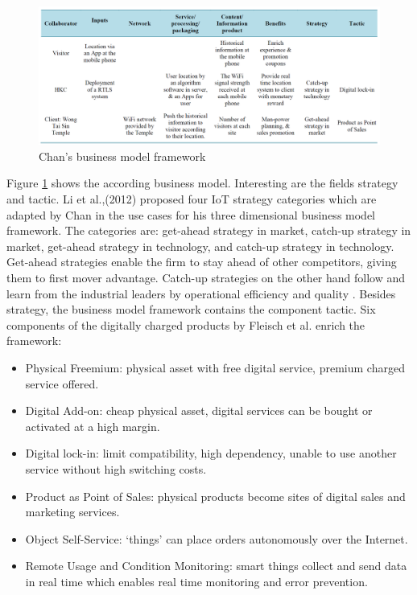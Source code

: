		\begin{figure}[ht]
		    \begin{center}
		    \includegraphics[scale=0.4]{Talk11/chanexample.png}
		    \end{center}
		    \caption{Chan's business model framework \cite[p.560]{chan}}
		    \label{fig:chan_ex}
		\end{figure}

		Figure \ref{fig:chan_ex} shows the according business model. Interesting are the fields strategy and tactic. Li et al.,(2012) \cite{li} proposed four IoT strategy categories which are adapted by Chan in the use cases for his three dimensional business model framework. The categories are: get-ahead strategy in market, catch-up strategy in market, get-ahead strategy in technology, and catch-up strategy in technology. Get-ahead strategies enable the firm to stay ahead of other competitors, giving them to first mover advantage. Catch-up strategies on the other hand follow and learn from the industrial leaders by operational efficiency and quality \cite{chan}.
		Besides strategy, the business model framework contains the component tactic. Six components of the digitally charged products by Fleisch et al.\cite{fleisch} enrich the framework:

		\begin{itemize}
			\item Physical Freemium: physical asset with free digital service, premium charged service offered.
			\item Digital Add-on: cheap physical asset, digital services can be bought or activated at a high margin.
			\item Digital lock-in: limit compatibility, high dependency, unable to use another service without high switching costs.
			\item Product as Point of Sales: physical products become  sites of digital sales and marketing services.
			\item Object Self-Service: `things' can place orders autonomously over the Internet. 
			\item Remote Usage and Condition Monitoring: smart things collect and send data in real time which enables real time monitoring and error prevention.
		\end{itemize}

